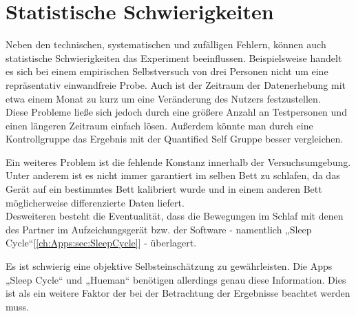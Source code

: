 
\section{Statistische Schwierigkeiten}
\label{ch:Relativierung:sec:StatistischeSchwierigkeiten}

Neben den technischen, systematischen und zufälligen Fehlern, können auch statistische Schwierigkeiten das Experiment beeinflussen.
Beispielsweise handelt es sich bei einem empirischen Selbstversuch von drei Personen nicht um eine repräsentativ einwandfreie Probe.
Auch ist der Zeitraum der Datenerhebung mit etwa einem Monat zu kurz um eine Veränderung des Nutzers festzustellen. \\
Diese Probleme ließe sich jedoch durch eine größere Anzahl an Testpersonen und einen längeren Zeitraum einfach lösen.
Außerdem könnte man durch eine Kontrollgruppe das Ergebnis mit der Quantified Self Gruppe besser vergleichen. 

Ein weiteres Problem ist die fehlende Konstanz innerhalb der Versuchsumgebung.
Unter anderem ist es nicht immer garantiert im selben Bett zu schlafen, da das Gerät auf ein bestimmtes Bett kalibriert wurde und in einem anderen Bett möglicherweise differenzierte Daten liefert.\\
Desweiteren besteht die Eventualität, dass die Bewegungen im Schlaf mit denen des Partner im Aufzeichungsgerät bzw. der Software - namentlich „Sleep Cycle“[\ref{ch:Apps:sec:SleepCycle}] - überlagert.

Es ist schwierig eine objektive Selbsteinschätzung zu gewährleisten. Die Apps „Sleep Cycle“ und „Hueman“ benötigen allerdings genau diese Information.
Dies ist als ein weitere Faktor der bei der Betrachtung der Ergebnisse beachtet werden muss.








